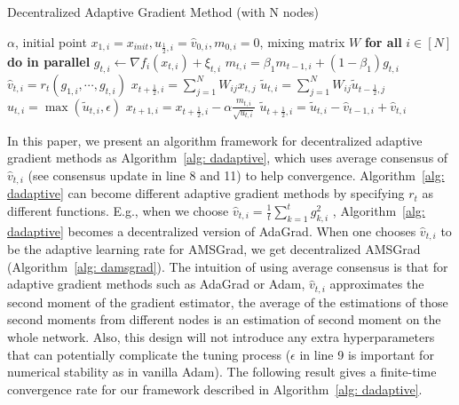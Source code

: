 \documentclass[11pt]{article}
\begin{document}
\begin{algorithm}[H]
	\caption{Decentralized Adaptive Gradient Method (with N nodes)}
	\label{alg: dadaptive}
	\begin{algorithmic}[1]
		  $\alpha$, initial point $x_{1,i} = x_{init}, u_{\frac{1}{2},i} = \hat v_{0,i}, m_{0,i}=0$, mixing matrix $W$
		\STATE \textbf{for all }$i \in [N]$ \textbf{do in parallel}
		\STATE \quad $g_{t,i}  \leftarrow \nabla f_i(x_{t,i}) + \xi_{t,i}$
		\STATE \quad $m_{t,i} = \beta_1 m_{t-1,i} + (1-\beta_1) g_{t,i}$ 
		\STATE  \quad $\hat v_{t,i} = r_t(g_{1,i},\cdots,g_{t,i})$
		\STATE \quad $x_{t+\frac{1}{2},i} = \sum_{j=1}^N W_{ij}x_{t,j}$
	    \STATE \quad $\tilde u_{t,i} = \sum_{j=1}^N W_{ij} \tilde u_{t-\frac{1}{2},j}$
	    \STATE  \quad $u_{t,i} = \max(\tilde u_{t,i}, \epsilon)$
		\STATE \quad $x_{t+1,i} = x_{t+\frac{1}{2},i} - \alpha \frac{m_{t,i}}{\sqrt{u_{t,i}}}$
		\STATE \quad $\tilde u_{t+\frac{1}{2},i} = \tilde u_{t,i} - \hat v_{t-1,i} + \hat v_{t,i}$
		\ENDFOR
	\end{algorithmic}
\end{algorithm}

In this paper, we present an algorithm framework for decentralized adaptive gradient methods as Algorithm~\ref{alg: dadaptive}, which uses average consensus of $\hat v_{t,i}$ (see consensus update in line 8 and 11) to help convergence.  
Algorithm~\ref{alg: dadaptive} can become different adaptive gradient methods by specifying $r_t$ as different functions. E.g., when we choose $\hat v_{t,i} = {\frac{1}{t}\sum_{k=1}^t g_{k,i}^2}$ , Algorithm~\ref{alg: dadaptive} becomes a decentralized version of AdaGrad. When one chooses $\hat v_{t,i}$ to be the adaptive learning rate for AMSGrad, we get decentralized AMSGrad (Algorithm~\ref{alg: damsgrad}).
The intuition of using average consensus is that for adaptive gradient methods such as AdaGrad or Adam, $\hat v_{t,i}$ approximates the second moment of the gradient estimator, the average of the estimations of those second moments from different nodes is an estimation of second moment on the whole network.  
Also, this design will not introduce any extra hyperparameters that can potentially complicate the tuning process ($\epsilon$ in line 9 is important for numerical stability as in vanilla Adam).  
The following result gives a finite-time convergence rate for our framework described in Algorithm~\ref{alg: dadaptive}.
\end{document}
